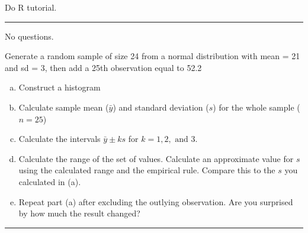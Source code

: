 \documentclass[11pt]{article}
\begin{document}
 Do R tutorial.
\hrule
No questions.


Generate a random sample of size 24 from a normal distribution with mean = 21 and sd = 3, then add a 25th observation equal to 52.2

\begin{enumerate}[a.]

\item Construct a histogram
\item Calculate sample mean ($\bar{y}$) and standard deviation ($s$) for the whole sample ($n=25$)
\item Calculate the intervals $\bar{y} \pm ks$ for $k = 1,2,\text{ and } 3$.
\item Calculate the range of the set of values. Calculate an approximate value for $s$ using the calculated range and the empirical rule. Compare this to the $s$ you
calculated in (a).
\item Repeat part (a) after excluding the outlying observation. Are you surprised by how much the result changed?
\end{enumerate}
\hrule
\end{document}
